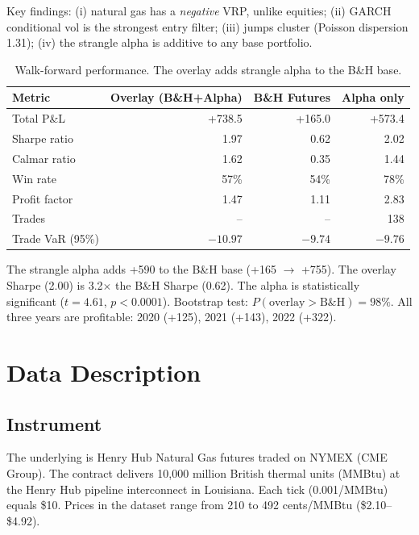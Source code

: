 \documentclass[11pt,a4paper]{article}
\begin{document}
Key findings: (i) natural gas has a \textit{negative} VRP, unlike equities; (ii) GARCH conditional vol is the strongest entry filter; (iii) jumps cluster (Poisson dispersion 1.31); (iv) the strangle alpha is additive to any base portfolio.

\begin{table}[H]
\centering
\caption{Walk-forward performance. The overlay adds strangle alpha to the B\&H base.}
\label{tab:summary}
\begin{tabular}{lrrr}
\toprule
Metric & Overlay (B\&H+Alpha) & B\&H Futures & Alpha only \\
\midrule
Total P\&L & +738.5 & +165.0 & +573.4 \\
Sharpe ratio & 1.97 & 0.62 & 2.02 \\
Calmar ratio & 1.62 & 0.35 & 1.44 \\
Win rate & 57\% & 54\% & 78\% \\
Profit factor & 1.47 & 1.11 & 2.83 \\
Trades & -- & -- & 138 \\
Trade VaR (95\%) & $-10.97$ & $-9.74$ & $-9.76$ \\
\bottomrule
\end{tabular}
\end{table}

The strangle alpha adds +590 to the B\&H base (+165 $\to$ +755). The overlay Sharpe (2.00) is 3.2$\times$ the B\&H Sharpe (0.62). The alpha is statistically significant ($t = 4.61$, $p < 0.0001$). Bootstrap test: $P(\text{overlay} > \text{B\&H}) = 98\%$. All three years are profitable: 2020 (+125), 2021 (+143), 2022 (+322).


\section{Data Description}

\subsection{Instrument}

The underlying is Henry Hub Natural Gas futures traded on NYMEX (CME Group). The contract delivers 10,000 million British thermal units (MMBtu) at the Henry Hub pipeline interconnect in Louisiana. Each tick (0.001/MMBtu) equals \$10. Prices in the dataset range from 210 to 492 cents/MMBtu (\$2.10--\$4.92).
\end{document}
